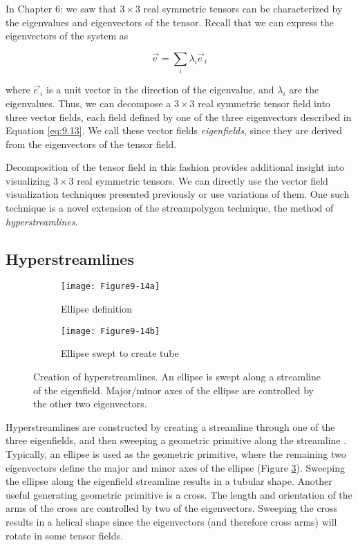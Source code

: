 In Chapter 6:  we saw that $3 \times 3$ real symmetric tensors can be characterized by the eigenvalues and eigenvectors of the tensor. Recall that we can express the eigenvectors of the system as

\begin{equation}\label{eq:9.13}
\overrightarrow{v\ } = \sum_i \lambda_i \overrightarrow{e\ }_i
\end{equation}

where $\overrightarrow{e\ }_i$ is a unit vector in the direction of the eigenvalue, and $\lambda_i$ are the eigenvalues. Thus, we can decompose a  $3 \times 3$ real symmetric tensor field into three vector fields, each field defined by one of the three eigenvectors described in Equation \ref{eq:9.13}. We call these vector fields \emph{eigenfields}, since they are derived from the eigenvectors of the tensor field.

Decomposition of the tensor field in this fashion provides additional insight into visualizing $3 \times 3$ real symmetric tensors. We can directly use the vector field visualization techniques presented previously or use variations of them. One such technique is a novel extension of the streampolygon technique, the method of \emph{hyperstreamlines}.

\subsection{Hyperstreamlines}

\begin{figure}[htb]
	\begin{subfigure}[h]{0.48\linewidth}
		\texttt{[image: Figure9-14a]}
		\captionsetup{justification=centering}
		\caption{Ellipse definition}
		\label{fig:Figure9-14a}
	\end{subfigure}
	\hfill
	\begin{subfigure}[h]{0.48\linewidth}
		\texttt{[image: Figure9-14b]}
		\captionsetup{justification=centering}
		\caption{Ellipse swept to create tube}
		\label{fig:Figure9-14b}
	\end{subfigure}
	\caption{Creation of hyperstreamlines. An ellipse is swept along a streamline of the eigenfield. Major/minor axes of the ellipse are controlled by the other two eigenvectors.}\label{fig:Figure9-14}
\end{figure}

Hyperstreamlines are constructed by creating a streamline through one of the three eigenfields, and then sweeping a geometric primitive along the streamline \cite{Delmarcelle93}. Typically, an ellipse is used as the geometric primitive, where the remaining two eigenvectors define the major and minor axes of the ellipse (Figure \ref{fig:Figure9-14}). Sweeping the ellipse along the eigenfield streamline results in a tubular shape. Another useful generating geometric primitive is a cross. The length and orientation of the arms of the cross are controlled by two of the eigenvectors. Sweeping the cross results in a helical shape since the eigenvectors (and therefore cross arms) will rotate in some tensor fields.

